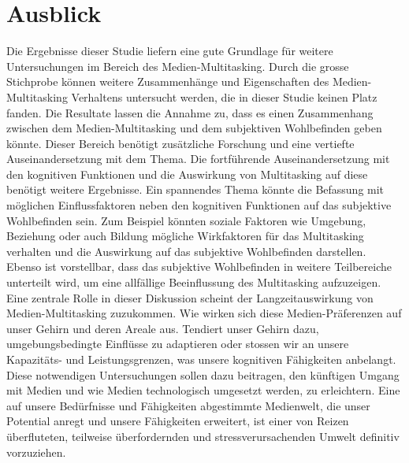 \section{Ausblick}\label{section.diskussion.ausblick}
Die Ergebnisse dieser Studie liefern eine gute Grundlage für weitere Untersuchungen im Bereich des Medien-Multitasking. Durch die grosse Stichprobe können weitere Zusammenhänge und Eigenschaften des Medien-Multitasking Verhaltens untersucht werden, die in dieser Studie keinen Platz fanden. Die Resultate lassen die Annahme zu, dass es einen Zusammenhang zwischen dem Medien-Multitasking und dem subjektiven Wohlbefinden geben könnte. Dieser Bereich benötigt zusätzliche Forschung und eine vertiefte Auseinandersetzung mit dem Thema. Die fortführende Auseinandersetzung mit den kognitiven Funktionen und die Auswirkung von Multitasking auf diese benötigt weitere Ergebnisse. Ein spannendes Thema könnte die Befassung mit möglichen Einflussfaktoren neben den kognitiven Funktionen auf das subjektive Wohlbefinden sein. Zum Beispiel könnten soziale Faktoren wie Umgebung, Beziehung oder auch Bildung mögliche Wirkfaktoren für das Multitasking verhalten und die Auswirkung auf das subjektive Wohlbefinden darstellen. Ebenso ist vorstellbar, dass das subjektive Wohlbefinden in weitere Teilbereiche unterteilt wird, um eine allfällige Beeinflussung des Multitasking aufzuzeigen. Eine zentrale Rolle in dieser Diskussion scheint der Langzeitauswirkung von Medien-Multitasking zuzukommen. Wie wirken sich diese Medien-Präferenzen auf unser Gehirn und deren Areale aus. Tendiert unser Gehirn dazu, umgebungsbedingte Einflüsse zu adaptieren oder stossen wir an unsere Kapazitäts- und Leistungsgrenzen, was unsere kognitiven Fähigkeiten anbelangt. Diese notwendigen Untersuchungen sollen dazu beitragen, den künftigen Umgang mit Medien und wie Medien technologisch umgesetzt werden, zu erleichtern. Eine auf unsere Bedürfnisse und Fähigkeiten abgestimmte Medienwelt, die unser Potential anregt und unsere Fähigkeiten erweitert, ist einer von Reizen überfluteten, teilweise überfordernden und stressverursachenden Umwelt definitiv vorzuziehen. 

